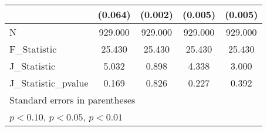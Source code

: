 {\begin{tabular}{l*{4}{c}}
            &     (0.064)         &     (0.002)         &     (0.005)         &     (0.005)         \\
\hline
N           &     929.000         &     929.000         &     929.000         &     929.000         \\
F\_Statistic &      25.430         &      25.430         &      25.430         &      25.430         \\
J\_Statistic &       5.032         &       0.898         &       4.338         &       3.000         \\
J\_Statistic\_pvalue&       0.169         &       0.826         &       0.227         &       0.392         \\
\hline\hline
\multicolumn{5}{l}{\footnotesize Standard errors in parentheses}\\
\multicolumn{5}{l}{\footnotesize \sym{*} \(p<0.10\), \sym{**} \(p<0.05\), \sym{***} \(p<0.01\)}\\
\end{tabular}
}
